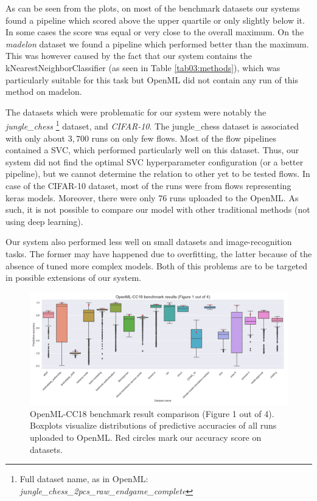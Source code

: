 As can be seen from the plots, on most of the benchmark datasets our systems
found a pipeline which scored above the upper quartile or only slightly below
it. In some cases the score was equal or very close to the overall maximum. On
the \emph{madelon} dataset we found a pipeline which performed better than the
maximum. This was however caused by the fact that our system contains the
kNearestNeighborClassifier (as seen in Table \ref{tab03:methods}), which was
particularly suitable for this task but OpenML did not contain any run of this
method on madelon.

The datasets which were problematic for our system were notably the
\emph{jungle\_chess} \footnote{Full dataset name, as in OpenML:
\emph{jungle\_chess\_2pcs\_raw\_endgame\_complete}} dataset, 
and \emph{CIFAR-10}. The jungle\_chess dataset is associated with only
about $3,700$ runs on only few flows. Most of the flow pipelines contained a
SVC, which performed particularly well on this dataset. Thus, our system did
not find the optimal SVC hyperparameter configuration (or a better pipeline),
but we cannot determine the relation to other yet to be tested flows.
In case of the CIFAR-10 dataset, most of the runs were from flows representing
keras models. \citep{chollet2015keras} Moreover, there were only 76 runs
uploaded to the OpenML. As such, it is not possible to compare our model with
other traditional methods (not using deep learning).

Our system also performed less well on small datasets and image-recognition
tasks. The former may have happened due to overfitting, the latter because of
the absence of tuned more complex models. Both of this problems are to be
targeted in possible extensions of our system.


\begin{figure}
    \includegraphics[width=\textwidth]{../img/openml-boxplot0.png}
    \caption[OpenML-CC18 benchmark result comparison (Figure 1 out of 4)]{
    OpenML-CC18 benchmark result comparison (Figure 1 out of 4).
    Boxplots visualize distributions of predictive accuracies of all
    runs uploaded to OpenML. Red circles mark our accuracy score on datasets.}
    \label{fig:OpenML:boxplot:0}
\end{figure}

